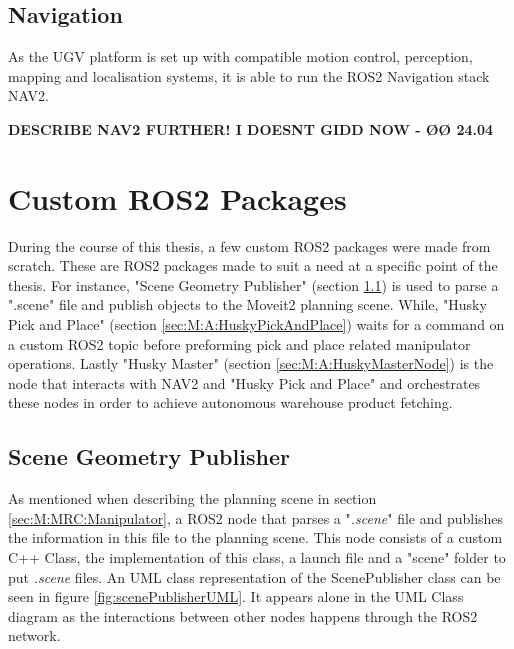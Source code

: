 \subsection{Navigation}
As the UGV platform is set up with compatible motion control, perception, mapping and localisation systems, it is able to run the ROS2 Navigation stack NAV2. 

\textbf{DESCRIBE NAV2 FURTHER! I DOESNT GIDD NOW - ØØ 24.04}


\section{Custom ROS2 Packages}
During the course of this thesis, a few custom ROS2 packages were made from scratch. These are ROS2 packages made to suit a need at a specific point of the thesis. For instance, "Scene Geometry Publisher" (section \ref{sec:M:A:SceneGeometryPublisher}) is used to parse a ".scene" file and publish objects to the Moveit2 planning scene. While, "Husky Pick and Place" (section \ref{sec:M:A:HuskyPickAndPlace}) waits for a command on a custom ROS2 topic before preforming pick and place related manipulator operations. Lastly "Husky Master" (section \ref{sec:M:A:HuskyMasterNode}) is the node that interacts with NAV2 and "Husky Pick and Place" and orchestrates these nodes in order to achieve autonomous warehouse product fetching.

\subsection{Scene Geometry Publisher} \label{sec:M:A:SceneGeometryPublisher}
As mentioned when describing the planning scene in section \ref{sec:M:MRC:Manipulator}, a ROS2 node that parses a "\textit{.scene}" file and publishes the information in this file to the planning scene. This node consists of a custom C++ Class, the implementation of this class, a launch file and a "scene" folder to put \textit{.scene} files. An UML class representation of the ScenePublisher class can be seen in figure \ref{fig:scenePublisherUML}. It appears alone in the UML Class diagram as the interactions between other nodes happens through the ROS2 network.

